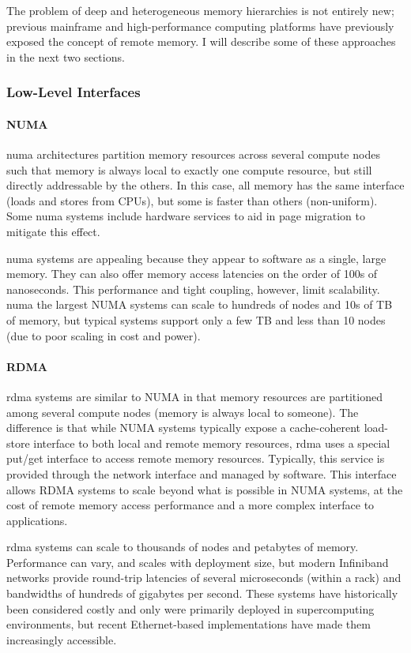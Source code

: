 The problem of deep and heterogeneous memory hierarchies is not entirely new;
previous mainframe and high-performance computing platforms have previously
exposed the concept of remote memory. I will describe some of these approaches
in the next two sections.

\subsubsection{Low-Level Interfaces}
\paragraph{NUMA}
\Gls{numa} architectures partition memory resources across several compute
nodes such that memory is always local to exactly one compute resource, but
still directly addressable by the others. In this case, all memory has the same
interface (loads and stores from CPUs), but some is faster than others
(non-uniform). Some \gls{numa} systems include hardware services to aid in page
migration to mitigate this effect\cite{sgi_origin}.

\Gls{numa} systems are appealing because they appear to software as a single,
large memory. They can also offer memory access latencies on the order of 100s
of nanoseconds. This performance and tight coupling, however, limit
scalability. \Gls{numa} the largest NUMA systems can scale to hundreds of nodes
and 10s of TB of memory\cite{sgiUV}, but typical systems support only a few TB
and less than 10 nodes (due to poor scaling in cost and power).

\paragraph{RDMA}
\gls{rdma} systems are similar to NUMA in that memory resources are partitioned
among several compute nodes (memory is always local to
someone)\cite{RoCE}\cite{RFC5040}. The difference is that while NUMA systems
typically expose a cache-coherent load-store interface to both local and remote
memory resources, \gls{rdma} uses a special put/get interface to access remote
memory resources.  Typically, this service is provided through the network
interface and managed by software. This interface allows RDMA systems to scale
beyond what is possible in NUMA systems, at the cost of remote memory access
performance and a more complex interface to applications.

\Gls{rdma} systems can scale to thousands of nodes and petabytes of
memory\cite{IB_ref_design}. Performance can vary, and scales with deployment
size, but modern Infiniband networks provide round-trip latencies of several
microseconds (within a rack) and bandwidths of hundreds of gigabytes per
second\cite{ib_perf}. These systems have historically been considered costly
and only were primarily deployed in supercomputing environments, but recent
Ethernet-based implementations have made them increasingly
accessible\cite{RoCE}.
 
